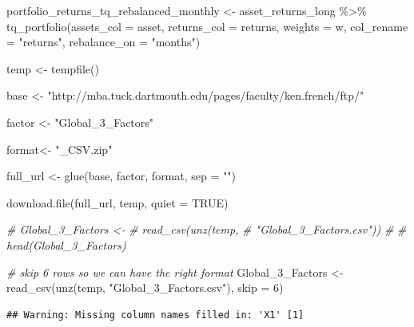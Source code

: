 \documentclass[
]{book}
\newenvironment{Shaded}{\begin{snugshade}}{\end{snugshade}}
\newcommand{\AttributeTok}[1]{\textcolor[rgb]{0.77,0.63,0.00}{#1}}
\newcommand{\CommentTok}[1]{\textcolor[rgb]{0.56,0.35,0.01}{\textit{#1}}}
\newcommand{\ConstantTok}[1]{\textcolor[rgb]{0.00,0.00,0.00}{#1}}
\newcommand{\DecValTok}[1]{\textcolor[rgb]{0.00,0.00,0.81}{#1}}
\newcommand{\FunctionTok}[1]{\textcolor[rgb]{0.00,0.00,0.00}{#1}}
\newcommand{\NormalTok}[1]{#1}
\newcommand{\OtherTok}[1]{\textcolor[rgb]{0.56,0.35,0.01}{#1}}
\newcommand{\SpecialCharTok}[1]{\textcolor[rgb]{0.00,0.00,0.00}{#1}}
\newcommand{\StringTok}[1]{\textcolor[rgb]{0.31,0.60,0.02}{#1}}
\begin{document}
\begin{Shaded}
\begin{Highlighting}[]
\NormalTok{portfolio\_returns\_tq\_rebalanced\_monthly }\OtherTok{\textless{}{-}} 
\NormalTok{  asset\_returns\_long }\SpecialCharTok{\%\textgreater{}\%}
  \FunctionTok{tq\_portfolio}\NormalTok{(}\AttributeTok{assets\_col  =}\NormalTok{ asset, }
               \AttributeTok{returns\_col =}\NormalTok{ returns,}
               \AttributeTok{weights     =}\NormalTok{ w,}
               \AttributeTok{col\_rename  =} \StringTok{"returns"}\NormalTok{,}
               \AttributeTok{rebalance\_on =} \StringTok{"months"}\NormalTok{)}
\end{Highlighting}
\end{Shaded}

\begin{Shaded}
\begin{Highlighting}[]
\NormalTok{temp }\OtherTok{\textless{}{-}} \FunctionTok{tempfile}\NormalTok{()}

\NormalTok{base }\OtherTok{\textless{}{-}} \StringTok{"http://mba.tuck.dartmouth.edu/pages/faculty/ken.french/ftp/"}

\NormalTok{factor }\OtherTok{\textless{}{-}}  \StringTok{"Global\_3\_Factors"}

\NormalTok{format}\OtherTok{\textless{}{-}} \StringTok{"\_CSV.zip"}

\NormalTok{full\_url }\OtherTok{\textless{}{-}} \FunctionTok{glue}\NormalTok{(base,}
\NormalTok{                 factor,}
\NormalTok{                 format,}
                 \AttributeTok{sep =} \StringTok{""}\NormalTok{)}

\FunctionTok{download.file}\NormalTok{(full\_url,}
\NormalTok{              temp,}
              \AttributeTok{quiet =} \ConstantTok{TRUE}\NormalTok{)}


\CommentTok{\# Global\_3\_Factors \textless{}{-}}
\CommentTok{\#   read\_csv(unz(temp,}
\CommentTok{\#                "Global\_3\_Factors.csv"))}
\CommentTok{\# }
\CommentTok{\# head(Global\_3\_Factors)  }

\CommentTok{\# skip 6 rows so we can have the right format}
\NormalTok{Global\_3\_Factors }\OtherTok{\textless{}{-}} 
  \FunctionTok{read\_csv}\NormalTok{(}\FunctionTok{unz}\NormalTok{(temp, }
               \StringTok{"Global\_3\_Factors.csv"}\NormalTok{), }
    \AttributeTok{skip =} \DecValTok{6}\NormalTok{)}
\end{Highlighting}
\end{Shaded}

\begin{verbatim}
## Warning: Missing column names filled in: 'X1' [1]
\end{verbatim}
\end{document}
